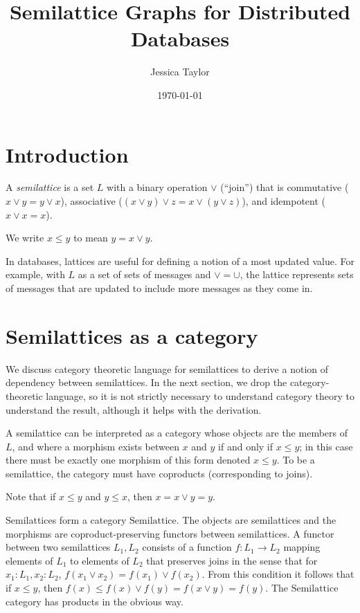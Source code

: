 \documentclass{article}
\title{Semilattice Graphs for Distributed Databases}
\author{Jessica Taylor}
\date{\today}
\begin{document}
    \maketitle
    
    \section{Introduction}
        A \emph{semilattice} is a set $L$ with a binary operation $\vee$ (``join'') that is commutative ($x \vee y = y \vee x$), associative ($(x \vee y) \vee z = x \vee (y \vee z)$), and idempotent ($x \vee x = x$).

        We write $x \leq y$ to mean $y = x \vee y$.

        In databases, lattices are useful for defining a notion of a most updated value. For example, with $L$ as a set of sets of messages and $\vee = \cup$, the lattice represents sets of messages that are updated to include more messages as they come in.

    \section{Semilattices as a category}

      We discuss category theoretic language for semilattices to derive a notion of dependency between semilattices. In the next section, we drop the category-theoretic language, so it is not strictly necessary to understand category theory to understand the result, although it helps with the derivation.

      A semilattice can be interpreted as a category whose objects are the members of $L$, and where a morphism exists between $x$ and $y$ if and only if $x \leq y$; in this case there must be exactly one morphism of this form denoted $x \leq y$. To be a semilattice, the category must have coproducts (corresponding to joins).

      Note that if $x \leq y$ and $y \leq x$, then $x = x \vee y = y$.

      Semilattices form a category $\mathrm{Semilattice}$.  The objects are semilattices and the morphisms are coproduct-preserving functors between semilattices. A functor between two semilattices $L_1, L_2$ consists of a function $f: L_1 \rightarrow L_2$ mapping elements of $L_1$ to elements of $L_2$ that preserves joins in the sense that for $x_1 : L_1, x_2 : L_2$, $f(x_1 \vee x_2) = f(x_1) \vee f(x_2)$. From this condition it follows that if $x \leq y$, then $f(x) \leq f(x) \vee f(y) = f(x \vee y) = f(y)$. The $\mathrm{Semilattice}$ category has products in the obvious way.
\end{document}
